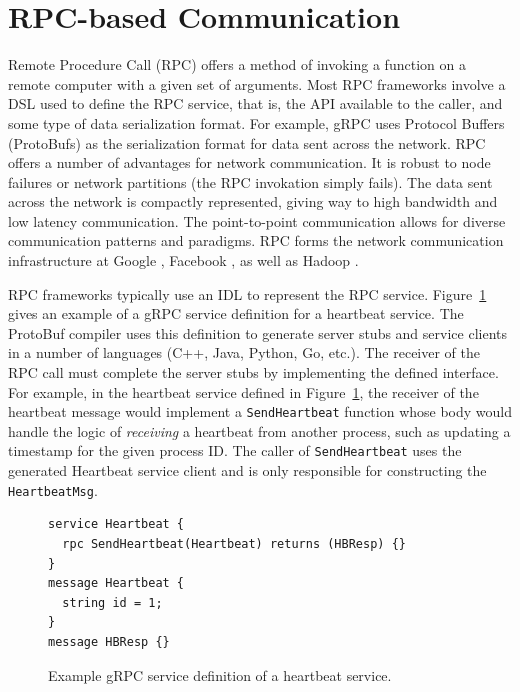 \documentclass[conference]{IEEEtran}
\begin{document}
\section{RPC-based Communication}
Remote Procedure Call (RPC) offers a method of invoking a function on a remote
computer with a given set of arguments. Most RPC frameworks involve a DSL used
to define the RPC service, that is, the API available to the caller, and some
type of data serialization format. For example, gRPC uses Protocol Buffers (ProtoBufs)
\cite{Varda2008} as the serialization format for data sent across the network.
RPC offers a number of advantages for network communication. It is robust to
node failures or network partitions (the RPC invokation simply fails). The data
sent across the network is compactly represented, giving way to high bandwidth
and low latency communication. The point-to-point communication allows for
diverse communication patterns and paradigms. RPC forms the network communication
infrastructure at Google \cite{van2017production}, Facebook \cite{Slee2007},
as well as Hadoop
\cite{Shvachko:2010:HDF:1913798.1914427, Lu:2013:HDH:2570457.2571128}.

RPC frameworks typically use an IDL to represent the RPC
service. Figure~\ref{fig:heartbeat} gives an example of a gRPC service
definition for a heartbeat service. The ProtoBuf compiler uses this definition
to generate server stubs and service clients in a number of languages (C++,
Java, Python, Go, etc.). The receiver of the RPC call must complete the server
stubs by implementing the defined interface. For example, in the heartbeat
service defined in Figure~\ref{fig:heartbeat}, the receiver of the heartbeat
message would implement a \texttt{SendHeartbeat} function whose body would
handle the logic of \emph{receiving} a heartbeat from another process,
such as updating a timestamp for the given process ID. The caller of
\texttt{SendHeartbeat} uses the generated Heartbeat service client and is only
responsible for constructing the \texttt{HeartbeatMsg}.

\begin{figure}
  \begin{lstlisting}
service Heartbeat {
  rpc SendHeartbeat(Heartbeat) returns (HBResp) {}
}
message Heartbeat {
  string id = 1;
}
message HBResp {}
\end{lstlisting}
\caption{Example gRPC service definition of a heartbeat service.}
\label{fig:heartbeat}
\end{figure}
\end{document}
